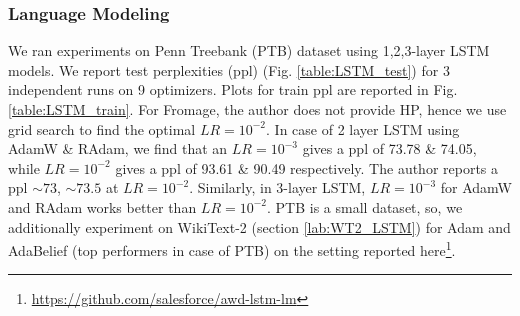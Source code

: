 \begin{table}[h]
    \begin{center}
    \vspace{2mm}
    \caption{Top-1 accuracy of ResNet18 on ImageNet. \textdagger\  is reported in \cite{chen_closing_2020}, and  \textdaggerdbl\  is reported in \cite{liu_variance_2020}} 
    \label{table:Imagenet Resnet-18 results}
    \end{center}
\end{table}









\subsubsection{Language Modeling}
\label{lab:Language_modling}
We ran experiments on Penn Treebank (PTB) dataset \cite{PTB} using 1,2,3-layer LSTM models. We report test perplexities (ppl) (Fig. \ref{table:LSTM_test}) for 3 independent runs on 9 optimizers. Plots for train ppl are reported in Fig. \ref{table:LSTM_train}. For Fromage, the author does not provide HP, hence we use grid search to find the optimal $LR=10^{-2}$. In case of 2 layer LSTM using AdamW \& RAdam, we find that an $LR=10^{-3}$ gives a ppl of 73.78 \& 74.05, while $LR=10^{-2}$ gives a ppl of 93.61 \& 90.49 respectively. The author reports a ppl $\sim 73$, $\sim 73.5$ at $LR=10^{-2}$. Similarly, in 3-layer LSTM, $LR=10^{-3}$ for AdamW and RAdam works better than $LR=10^{-2}$. PTB is a small dataset, so, we additionally experiment on WikiText-2 (section \ref{lab:WT2_LSTM}) for Adam and AdaBelief (top performers in case of PTB) on the setting reported here\footnote{\href{https://github.com/salesforce/awd-lstm-lm}{https://github.com/salesforce/awd-lstm-lm}}.


